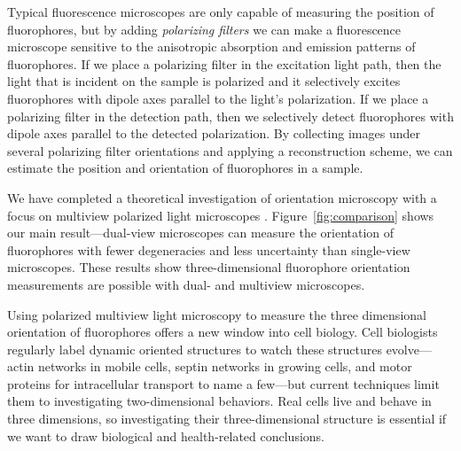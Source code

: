 \documentclass[11pt]{article}
\begin{document}
Typical fluorescence microscopes are only capable of measuring the position of
fluorophores, but by adding \textit{polarizing filters} we can make a
fluorescence microscope sensitive to the anisotropic absorption and emission
patterns of fluorophores. If we place a polarizing filter in the excitation
light path, then the light that is incident on the sample is polarized and it
selectively excites fluorophores with dipole axes parallel to the light's
polarization. If we place a polarizing filter in the detection path, then we
selectively detect fluorophores with dipole axes parallel to the detected
polarization. By collecting images under several polarizing filter orientations
and applying a reconstruction scheme, we can estimate the position and
orientation of fluorophores in a sample.

We have completed a theoretical investigation of orientation microscopy with a
focus on multiview polarized light microscopes
\cite{chandler17}. Figure~\ref{fig:comparison} shows our main result---dual-view
microscopes can measure the orientation of fluorophores with fewer degeneracies
and less uncertainty than single-view microscopes. These results show
three-dimensional fluorophore orientation measurements are possible with dual-
and multiview microscopes.

Using polarized multiview light microscopy to measure the three dimensional
orientation of fluorophores offers a new window into cell biology. Cell
biologists regularly label dynamic oriented structures to watch these structures
evolve---actin networks in mobile cells, septin networks in growing cells, and
motor proteins for intracellular transport to name a few---but current
techniques limit them to investigating two-dimensional behaviors. Real cells
live and behave in three dimensions, so investigating their three-dimensional
structure is essential if we want to draw biological and health-related
conclusions.
\end{document}
